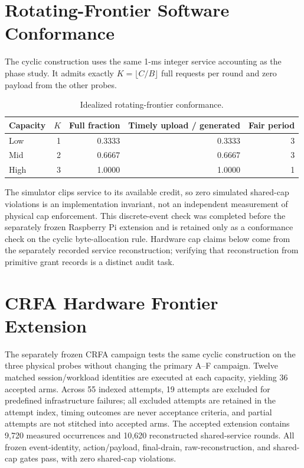 \documentclass[10pt,onecolumn]{IEEEtran}
\begin{document}
\section{Rotating-Frontier Software Conformance}
The cyclic construction uses the same 1-ms integer service accounting as the
phase study. It admits exactly $K=\lfloor C/B\rfloor$ full requests per round
and zero payload from the other probes.
\begin{table}[h]\centering\caption{Idealized rotating-frontier conformance.}
\begin{tabular}{lrrrr}\toprule
Capacity & $K$ & Full fraction & Timely upload / generated & Fair period\\\midrule
Low & 1 & 0.3333 & 0.3333 & 3\\
Mid & 2 & 0.6667 & 0.6667 & 3\\
High & 3 & 1.0000 & 1.0000 & 1\\\bottomrule
\end{tabular}\end{table}
The simulator clips service to its available credit, so zero simulated
shared-cap violations is an implementation invariant, not an independent
measurement of physical cap enforcement. This discrete-event check was
completed before the separately frozen Raspberry Pi extension and is retained
only as a conformance check on the cyclic byte-allocation rule. Hardware cap
claims below come from the separately recorded service reconstruction;
verifying that reconstruction from primitive grant records is a distinct
audit task.

\section{CRFA Hardware Frontier Extension}
The separately frozen CRFA campaign tests the same cyclic construction on the
three physical probes without changing the primary A--F campaign. Twelve
matched session/workload identities are executed at each capacity, yielding
36 accepted arms. Across 55 indexed attempts, 19 attempts are excluded for
predefined infrastructure failures; all excluded attempts are retained in the
attempt index, timing outcomes are never acceptance criteria, and partial
attempts are not stitched into accepted arms. The accepted extension contains
9,720 measured occurrences and 10,620 reconstructed shared-service rounds.
All frozen event-identity, action/payload, final-drain, raw-reconstruction,
and shared-cap gates pass, with zero shared-cap violations.
\end{document}
